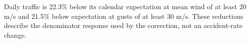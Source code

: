 Daily traffic is 22.3\% below its calendar expectation at mean wind of at least 20 m/s and 21.5\% below expectation at gusts of at least 30 m/s. These reductions describe the denominator response used by the correction, not an accident-rate change.
